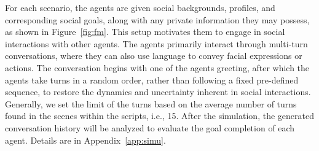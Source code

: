 For each scenario, the agents are given social backgrounds, profiles, and corresponding social goals, along with any private information they may possess, as shown in Figure~\ref{fig:fm}.
This setup motivates them to engage in social interactions with other agents. The agents primarily interact through multi-turn conversations, where they can also use language to convey facial expressions or actions.
The conversation begins with one of the agents greeting, after which the agents take turns in a random order, rather than following a fixed pre-defined sequence, to restore the dynamics and uncertainty inherent in social interactions.
Generally, we set the limit of the turns based on the average number of turns found in the scenes within the scripts, i.e., 15.
After the simulation, the generated conversation history will be analyzed to evaluate the goal completion of each agent.
Details are in Appendix~\ref{app:simu}.